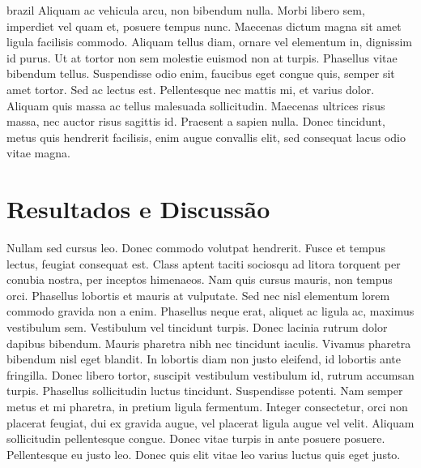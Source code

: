 \begin{otherlanguage*}{brazil}
        Aliquam ac vehicula arcu, non bibendum nulla. Morbi libero sem,
        imperdiet vel quam et, posuere tempus nunc. Maecenas dictum magna sit amet ligula facilisis
        commodo. Aliquam tellus diam, ornare vel elementum in, dignissim id purus. Ut at tortor non
        sem molestie euismod non at turpis. Phasellus vitae bibendum tellus. Suspendisse odio enim,
        faucibus eget congue quis, semper sit amet tortor. Sed ac lectus est. Pellentesque nec
        mattis mi, et varius dolor. Aliquam quis massa ac tellus malesuada sollicitudin. Maecenas
        ultrices risus massa, nec auctor risus sagittis id. Praesent a sapien nulla. Donec
        tincidunt, metus quis hendrerit facilisis, enim augue convallis elit, sed consequat lacus
        odio vitae magna.

        \section*{Resultados e Discussão}
        Nullam sed cursus leo. Donec commodo volutpat hendrerit. Fusce et tempus lectus, feugiat
        consequat est. Class aptent taciti sociosqu ad litora torquent per conubia nostra, per
        inceptos himenaeos. Nam quis cursus mauris, non tempus orci. Phasellus lobortis et mauris at
        vulputate. Sed nec nisl elementum lorem commodo gravida non a enim. Phasellus neque erat,
        aliquet ac ligula ac, maximus vestibulum sem. Vestibulum vel tincidunt turpis. Donec lacinia
        rutrum dolor dapibus bibendum. Mauris pharetra nibh nec tincidunt iaculis. Vivamus pharetra
        bibendum nisl eget blandit. In lobortis diam non justo eleifend, id lobortis ante fringilla.
        Donec libero tortor, suscipit vestibulum vestibulum id, rutrum accumsan turpis. Phasellus
        sollicitudin luctus tincidunt. Suspendisse potenti. Nam semper metus et mi pharetra, in
        pretium ligula fermentum. Integer consectetur, orci non placerat feugiat, dui ex gravida
        augue, vel placerat ligula augue vel velit. Aliquam sollicitudin pellentesque congue. Donec
        vitae turpis in ante posuere posuere. Pellentesque eu justo leo. Donec quis elit vitae leo
        varius luctus quis eget justo.


\end{otherlanguage*}
